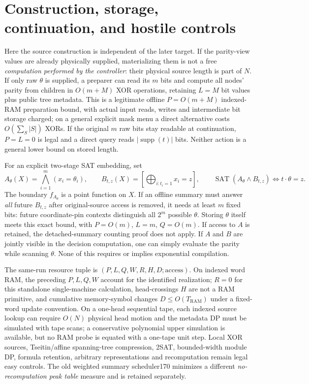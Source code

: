 \documentclass[11pt]{article}
\begin{document}
\section{Construction, storage, continuation, and hostile controls}
Here the source construction is independent of the later target. If the parity-view values are already physically supplied, materializing them is not a free \emph{computation performed by the controller}: their physical source length is part of $N$. If only raw $\theta$ is supplied, a preparer can read its $m$ bits and compute all nodes' parity from children in $O(m+M)$ XOR operations, retaining $L=M$ bit values plus public tree metadata. This is a legitimate offline $P=O(m+M)$ indexed-RAM preparation bound, with actual input reads, writes and intermediate bit storage charged; on a general explicit mask menu a direct alternative costs $O(\sum_S|S|)$ XORs. If the original $m$ raw bits stay readable at continuation, $P=L=0$ is legal and a direct query reads $|\operatorname{supp}(t)|$ bits. Neither action is a general lower bound on stored length.

For an explicit two-stage SAT embedding, set
\[
A_\theta(X)=\bigwedge_{i=1}^m(x_i=\theta_i),\qquad
B_{t,z}(X)=[\bigoplus_{i:t_i=1}x_i=z],\qquad
\operatorname{SAT}(A_\theta\land B_{t,z})\iff t\cdot\theta=z.
\]
The boundary $f_{A_\theta}$ is a point function on $X$. If an offline summary must answer \emph{all} future $B_{t,z}$ after original-source access is removed, it needs at least $m$ fixed bits: future coordinate-pin contexts distinguish all $2^m$ possible $\theta$. Storing $\theta$ itself meets this exact bound, with $P=O(m)$, $L=m$, $Q=O(m)$. If access to $A$ is retained, the detached-summary counting proof does not apply. If $A$ and $B$ are jointly visible in the decision computation, one can simply evaluate the parity while scanning $\theta$. None of this requires or implies exponential compilation.

The same-run resource tuple is $(P,L,Q,W,R,H,D;\mathrm{access})$. On indexed word RAM, the preceding $P,L,Q,W$ account for the identified realization; $R=0$ for this standalone single-machine calculation, head-crossings $H$ are not a RAM primitive, and cumulative memory-symbol changes $D\le O(T_{\mathrm{RAM}})$ under a fixed-word update convention. On a one-head sequential tape, each indexed source lookup can require $O(N)$ physical head motion and the metadata DP must be simulated with tape scans; a conservative polynomial upper simulation is available, but no RAM probe is equated with a one-tape unit step. Local XOR sources, Tseitin/affine spanning-tree compression, 2SAT, bounded-width module DP, formula retention, arbitrary representations and recomputation remain legal easy controls. The old weighted summary scheduler170 minimizes a different \emph{no-recomputation peak table} measure and is retained separately.
\end{document}
